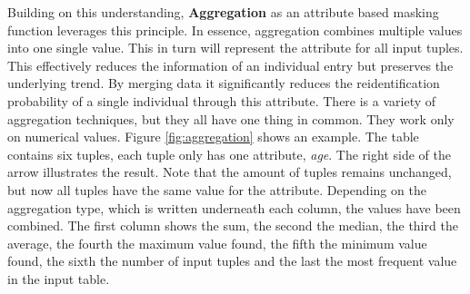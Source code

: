 Building on this understanding, \textbf{Aggregation} as an attribute based masking function leverages this principle. In essence, aggregation combines multiple values into one single value. This in turn will represent the attribute for all input tuples. This effectively reduces the information of an individual entry but preserves the underlying trend. By merging data it significantly reduces the reidentification probability of a single individual through this attribute. There is a variety of aggregation techniques, but they all have one thing in common. They work only on numerical values. Figure \ref{fig:aggregation} shows an example. The table contains six tuples, each tuple only has one attribute, \textit{age}. The right side of the arrow illustrates the result. Note that the amount of tuples remains unchanged, but now all tuples have the same value for the attribute. Depending on the aggregation type, which is written underneath each column, the values have been combined. The first column shows the sum, the second the median, the third the average, the fourth the maximum value found, the fifth the minimum value found, the sixth the number of input tuples and the last the most frequent value in the input table. 

\bigskip

